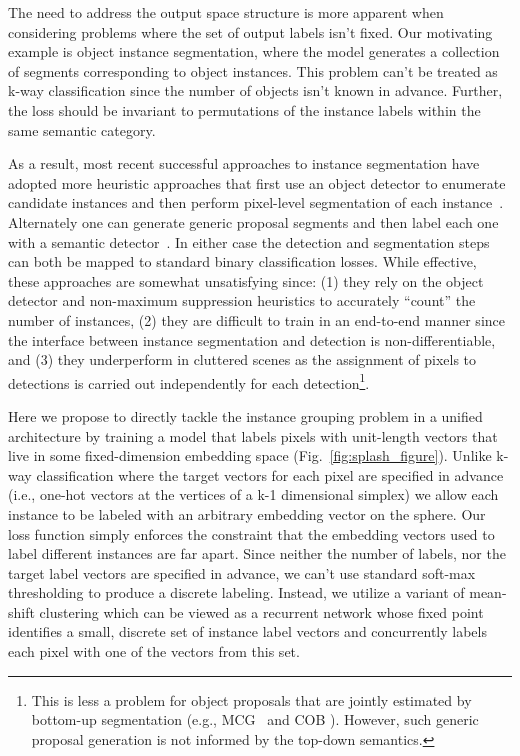 The need to address the output space structure is more apparent when
considering problems where the set of output labels isn't fixed.  Our
motivating example is object instance segmentation, where the model generates a
collection of segments corresponding to object instances.  This problem
can't be treated as k-way classification since the number of objects isn't
known in advance.  Further, the loss should be invariant to permutations of
the instance labels within the same semantic category.




As a result, most recent successful approaches to instance segmentation have
adopted more heuristic approaches that first use an object detector to
enumerate candidate instances and then perform pixel-level segmentation of each
instance~\cite{liang2015proposal, dai2016instance, li2016fully,
liang2016reversible, arnab2017pixelwise}.  Alternately one can generate generic
proposal segments and then label each one with a semantic
detector~\cite{hariharan2014simultaneous, chen2015multi,
hariharan2015hypercolumns, dai2015convolutional, uhrig2016pixel, he2017mask}.
In either case the detection and segmentation steps can both be mapped to
standard binary classification losses.  While effective, these approaches are
somewhat unsatisfying since: (1) they rely on the object detector and
non-maximum suppression heuristics to accurately ``count'' the number of
instances, (2) they are difficult to train in an end-to-end manner since the
interface between instance segmentation and detection is non-differentiable,
and (3) they underperform in cluttered scenes as the assignment of pixels to
detections is carried out independently for each detection\footnote{This is
less a problem for object proposals that are jointly estimated by bottom-up
segmentation (e.g., MCG~\cite{pont2017multiscale} and COB
\cite{maninis2017convolutional}).  However, such generic proposal generation is
not informed by the top-down semantics.}.

Here we propose to directly tackle the instance grouping problem in a unified
architecture by training a model that labels pixels with unit-length vectors
that live in some fixed-dimension embedding space
(Fig.~\ref{fig:splash_figure}).  Unlike k-way classification where the target
vectors for each pixel are specified in advance (i.e., one-hot vectors at the
vertices of a k-1 dimensional simplex) we allow each instance to be labeled
with an arbitrary embedding vector on the sphere.  Our loss function simply
enforces the constraint that the embedding vectors used to label different
instances are far apart.  Since neither the number of labels, nor the target
label vectors are specified in advance, we can't use standard soft-max
thresholding to produce a discrete labeling.  Instead, we utilize a
variant of mean-shift clustering which can be viewed as a recurrent network
whose fixed point identifies a small, discrete set of instance label vectors
and concurrently labels each pixel with one of the vectors from this set.

